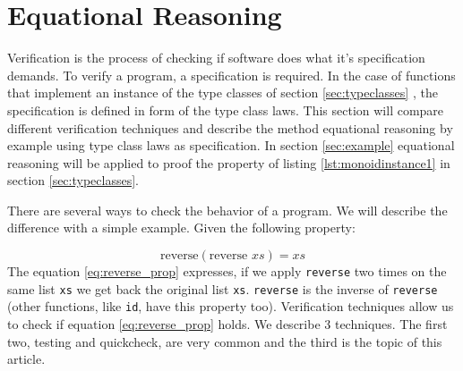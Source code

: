 \section{Equational Reasoning}
\label{sec:equationalreasoning}

Verification is the process of checking if software does what it's specification demands. To verify a program, a specification is required. In the case of functions that implement an instance of the type classes of section \ref{sec:typeclasses} , the specification is defined in form of the type class laws.
This section will compare different verification techniques and describe the method equational reasoning by example using type class laws as specification. In section \ref{sec:example} equational reasoning will be applied to proof the property of listing \ref{lst:monoidinstance1} in section \ref{sec:typeclasses}.

There are several ways to check the behavior of a program. 
We will describe the difference with a simple example. Given the following property:

\begin{equation}
  \label{eq:reverse_prop}
\text{reverse} (\text{reverse } xs) = xs  
\end{equation}
The equation \ref{eq:reverse_prop} expresses, if we apply \verb|reverse| two times on the same list \verb|xs| we get back the original list \verb|xs|. \verb|reverse| is the inverse of \verb|reverse| (other functions, like \verb|id|, have this property too). Verification techniques allow us to check if equation \ref{eq:reverse_prop} holds. We describe 3 techniques. The first two, testing and quickcheck, are very common and the third is the topic of this article.

